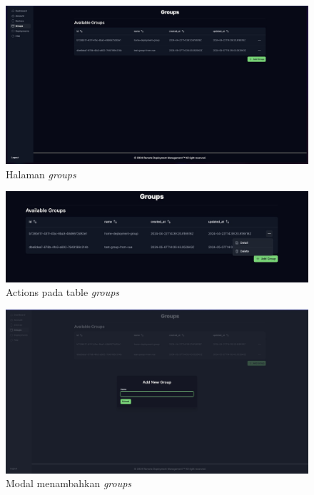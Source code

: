 \begin{figure}[h]
  \centering
  \includegraphics[width=1\textwidth]{resources/chapter-4/dashboard/groups-page.jpg}
  \caption{Halaman \textit{groups}}
  \label{fig:halaman-groups}
\end{figure}

\begin{figure}[h]
  \centering
  \includegraphics[width=1\textwidth]{resources/chapter-4/dashboard/groups-page-actions.jpg}
  \caption{Actions pada table \textit{groups}}
  \label{fig:halaman-groups-actions}
\end{figure}

\begin{figure}[h]
  \centering
  \includegraphics[width=1\textwidth]{resources/chapter-4/dashboard/groups-page-add.jpg}
  \caption{Modal menambahkan \textit{groups}}
  \label{fig:halaman-groups-add}
\end{figure}

